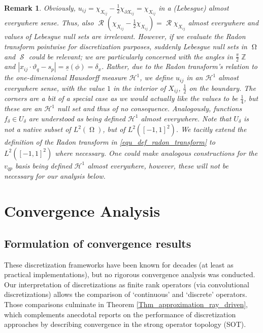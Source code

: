 \documentclass[11pt,reqno]{amsart}
\DeclareMathOperator{\ZZ}{\mathbb{Z}}
\DeclareMathOperator{\Radon}{\mathcal{R}}
\DeclareMathOperator{\imgdom}{\Omega}
\DeclareMathOperator{\sinodom}{\mathcal{S}}
\numberwithin{theorem}{section}
\newtheorem{remark}[theorem]{Remark}
\theoremstyle{remark}
\begin{document}
\begin{remark} \label{remark_using_hausdorff_ae}
Obviously, $u_{ij}=\chi_{X_{ij}}- \frac{1}{2} \chi_{\partial X_{ij}}=\chi_{X_{ij}}$ in a (Lebesgue) almost everywhere sense. Thus, also $\Radon (\chi_{X_{ij}}- \frac{1}{2} \chi_{X_{ij}})= \Radon \chi_{X_{ij}}$ almost everywhere and values of Lebesgue null sets are irrelevant.
However, if we evaluate the Radon transform pointwise for discretization purposes, suddenly Lebesgue null sets in $\imgdom$ and $\sinodom$ could be relevant; we are particularly concerned with the angles in $\frac{\pi}{2}\ZZ$ and $|x_{ij}\cdot \vartheta_q-s_p|=\underline s(\phi)=\delta_x$. Rather, due to the Radon transform's relation to the one-dimensional Hausdorff measure $\mathcal{H}^1$, we define $u_{ij}$ in an $\mathcal{H}^1$ almost everywhere sense, with the value $1$ in the interior of $X_{ij}$, $\frac{1}{2}$ on the boundary. The corners are a bit of a special case as we would actually like the values to be $\frac{1}{4}$, but these are an $\mathcal{H}^1$ null set and thus of no consequence. Analogously, functions $f_\delta\in U_\delta$ are understood as being defined $\mathcal{H}^1$ almost everywhere. Note that $U_\delta$ is not a native subset of $L^2(\imgdom)$, but of $L^2([-1,1]^2)$. We tacitly extend the definition of the Radon transform in \eqref{equ_def_radon_transform} to $L^2([-1,1]^2)$ where necessary. One could make analogous constructions for the $v_{qp}$ basis being defined $\mathcal{H}^1$ almost everywhere, however, these will not be necessary for our analysis below.

\end{remark}




\section{Convergence Analysis}
\label{section_Radon_proofs}


\subsection{Formulation  of convergence results}
\label{section_results}
These discretization frameworks have been known for decades (at least as practical implementations), but no rigorous convergence analysis was conducted. Our interpretation of discretizations as finite rank operators (via convolutional discretizations) allows the comparison of `continuous' and `discrete' operators. Those comparisons culminate in Theorem \ref{Thm_approximation_ray_driven}, which complements anecdotal reports on the performance of discretization approaches by describing convergence in the strong operator topology (SOT).
\end{document}
